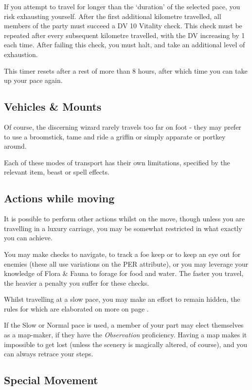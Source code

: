 \normalsize
If you attempt to travel for longer than the `duration' of the selected pace, you risk exhausting yourself. After the first additional kilometre travelled, all members of the party must succeed a DV 10 Vitality check. This check must be repeated after every subsequent kilometre travelled, with the DV increasing by 1 each time. After failing this check, you must halt, and take an additional level of exhaustion. 

This timer resets after a rest of more than 8 hours, after which time you can take up your pace again. 

\subsection{Vehicles \& Mounts}

Of course, the discerning wizard rarely travels too far on foot - they may prefer to use a broomstick, tame and ride a griffin or simply apparate or portkey around. 

Each of these modes of transport has their own limitations, specified by the relevant item, beast or spell effects. 

\subsection{Actions while moving}

It is possible to perform other actions whilst on the move, though unless you are travelling in a luxury carriage, you may be somewhat restricted in what exactly you can achieve. 

You may make checks to navigate, to track a foe keep or to keep an eye out for enemies (these all use variations on the PER attribute), or you may leverage your knowledge of Flora \& Fauna to forage for food and water. The faster you travel, the heavier a penalty you suffer for these checks. 

Whilst travelling at a slow pace, you may make an effort to remain hidden, the rules for which are elaborated on more on page \pageref{S:Stealth}. 

If the Slow or Normal pace is used, a member of your part may elect themselves as a map-maker, if they have the {\it Observation} proficiency. Having a map makes it impossible to get lost (unless the scenery is magically altered, of course), and you can always retrace your steps. 

\subsection{Special Movement}\label{S:SpecialMovement}

